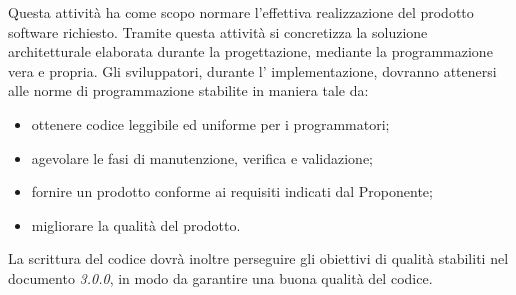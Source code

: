     Questa attività ha come scopo normare l'effettiva realizzazione del prodotto software richiesto. Tramite questa attività si concretizza la soluzione architetturale elaborata durante la progettazione, mediante la programmazione vera e propria.
    Gli sviluppatori, durante l' implementazione, dovranno attenersi alle norme di programmazione stabilite in maniera tale da:
    \begin{itemize}
       	\item ottenere codice leggibile ed uniforme per i programmatori;
       	\item agevolare le fasi di manutenzione, verifica e validazione;
       	\item fornire un prodotto conforme ai requisiti indicati dal Proponente;
       	\item migliorare la qualità del prodotto.
   	\end{itemize}

   	\noindent La scrittura del codice dovrà inoltre perseguire gli obiettivi di qualità stabiliti nel documento \textit{\PdQ{} 3.0.0}, in modo da garantire una buona qualità del codice.
